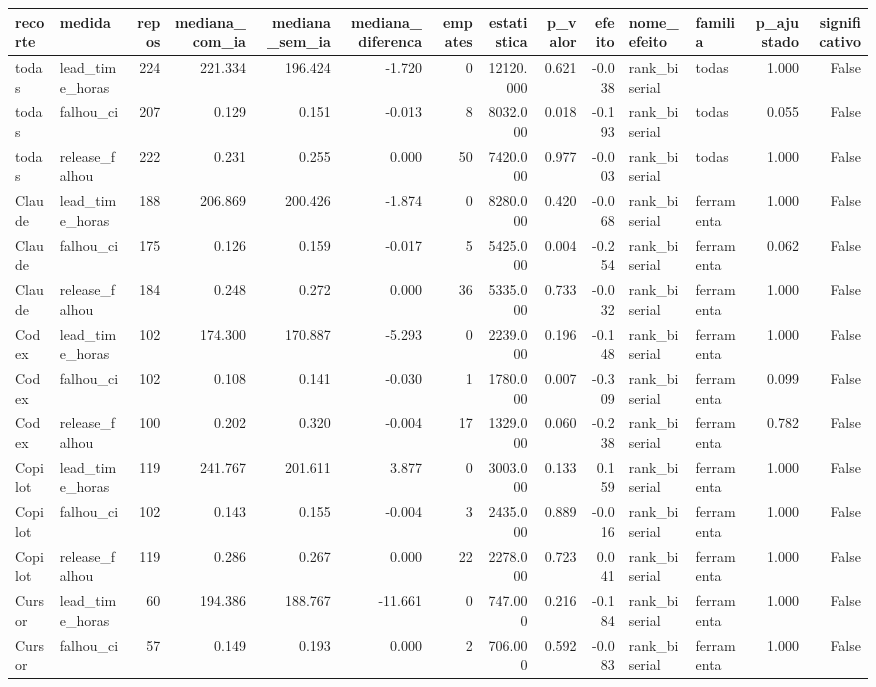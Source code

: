 \begin{tabular}{llrrrrrrrrllrr}
\toprule
recorte & medida & repos & mediana_com_ia & mediana_sem_ia & mediana_diferenca & empates & estatistica & p_valor & efeito & nome_efeito & familia & p_ajustado & significativo \\
\midrule
todas & lead_time_horas & 224 & 221.334 & 196.424 & -1.720 & 0 & 12120.000 & 0.621 & -0.038 & rank_biserial & todas & 1.000 & False \\
todas & falhou_ci & 207 & 0.129 & 0.151 & -0.013 & 8 & 8032.000 & 0.018 & -0.193 & rank_biserial & todas & 0.055 & False \\
todas & release_falhou & 222 & 0.231 & 0.255 & 0.000 & 50 & 7420.000 & 0.977 & -0.003 & rank_biserial & todas & 1.000 & False \\
Claude & lead_time_horas & 188 & 206.869 & 200.426 & -1.874 & 0 & 8280.000 & 0.420 & -0.068 & rank_biserial & ferramenta & 1.000 & False \\
Claude & falhou_ci & 175 & 0.126 & 0.159 & -0.017 & 5 & 5425.000 & 0.004 & -0.254 & rank_biserial & ferramenta & 0.062 & False \\
Claude & release_falhou & 184 & 0.248 & 0.272 & 0.000 & 36 & 5335.000 & 0.733 & -0.032 & rank_biserial & ferramenta & 1.000 & False \\
Codex & lead_time_horas & 102 & 174.300 & 170.887 & -5.293 & 0 & 2239.000 & 0.196 & -0.148 & rank_biserial & ferramenta & 1.000 & False \\
Codex & falhou_ci & 102 & 0.108 & 0.141 & -0.030 & 1 & 1780.000 & 0.007 & -0.309 & rank_biserial & ferramenta & 0.099 & False \\
Codex & release_falhou & 100 & 0.202 & 0.320 & -0.004 & 17 & 1329.000 & 0.060 & -0.238 & rank_biserial & ferramenta & 0.782 & False \\
Copilot & lead_time_horas & 119 & 241.767 & 201.611 & 3.877 & 0 & 3003.000 & 0.133 & 0.159 & rank_biserial & ferramenta & 1.000 & False \\
Copilot & falhou_ci & 102 & 0.143 & 0.155 & -0.004 & 3 & 2435.000 & 0.889 & -0.016 & rank_biserial & ferramenta & 1.000 & False \\
Copilot & release_falhou & 119 & 0.286 & 0.267 & 0.000 & 22 & 2278.000 & 0.723 & 0.041 & rank_biserial & ferramenta & 1.000 & False \\
Cursor & lead_time_horas & 60 & 194.386 & 188.767 & -11.661 & 0 & 747.000 & 0.216 & -0.184 & rank_biserial & ferramenta & 1.000 & False \\
Cursor & falhou_ci & 57 & 0.149 & 0.193 & 0.000 & 2 & 706.000 & 0.592 & -0.083 & rank_biserial & ferramenta & 1.000 & False \\

\end{tabular}
